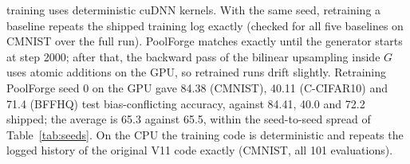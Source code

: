 training uses deterministic cuDNN kernels. With the same seed, retraining a baseline repeats the shipped training
log exactly (checked for all five baselines on CMNIST over the full run). PoolForge matches exactly until the
generator starts at step 2000; after that, the backward pass of the bilinear upsampling inside $G$ uses atomic
additions on the GPU, so retrained runs drift slightly. Retraining PoolForge seed 0 on the GPU gave 84.38
(CMNIST), 40.11 (C-CIFAR10) and 71.4 (BFFHQ) test bias-conflicting accuracy, against 84.41, 40.0 and 72.2 shipped;
the average is 65.3 against 65.5, within the seed-to-seed spread of Table~\ref{tab:seeds}.
On the CPU the training code is deterministic and repeats the logged history of the original V11 code exactly
(CMNIST, all 101 evaluations).
